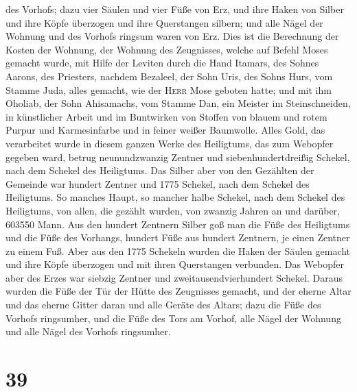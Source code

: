 des Vorhofs;  dazu vier Säulen und vier Füße von Erz, und
ihre Haken von Silber und ihre Köpfe überzogen und ihre Querstangen
silbern;  und alle Nägel der Wohnung und des Vorhofs
ringsum waren von Erz.  Dies ist die Berechnung der
Kosten der Wohnung, der Wohnung des Zeugnisses, welche auf Befehl Moses
gemacht wurde, mit Hilfe der Leviten durch die Hand Itamars, des Sohnes
Aarons, des Priesters,  nachdem Bezaleel, der Sohn Uris,
des Sohns Hurs, vom Stamme Juda, alles gemacht, wie der \textsc{Herr}
Mose geboten hatte;  und mit ihm Oholiab, der Sohn
Ahisamachs, vom Stamme Dan, ein Meister im Steinschneiden, in
künstlicher Arbeit und im Buntwirken von Stoffen von blauem und rotem
Purpur und Karmesinfarbe und in feiner weißer Baumwolle. 
Alles Gold, das verarbeitet wurde in diesem ganzen Werke des Heiligtums,
das zum Webopfer gegeben ward, betrug neunundzwanzig Zentner und
siebenhundertdreißig Schekel, nach dem Schekel des Heiligtums.
 Das Silber aber von den Gezählten der Gemeinde war
hundert Zentner und 1775 Schekel, nach dem Schekel des Heiligtums.
 So manches Haupt, so mancher halbe Schekel, nach dem
Schekel des Heiligtums, von allen, die gezählt wurden, von zwanzig
Jahren an und darüber, 603550 Mann.  Aus den hundert
Zentnern Silber goß man die Füße des Heiligtums und die Füße des
Vorhangs, hundert Füße aus hundert Zentnern, je einen Zentner zu einem
Fuß.  Aber aus den 1775 Schekeln wurden die Haken der
Säulen gemacht und ihre Köpfe überzogen und mit ihren Querstangen
verbunden.  Das Webopfer aber des Erzes war siebzig
Zentner und zweitausendvierhundert Schekel.  Daraus
wurden die Füße der Tür der Hütte des Zeugnisses gemacht, und der eherne
Altar und das eherne Gitter daran und alle Geräte des Altars;
 dazu die Füße des Vorhofs ringsumher, und die Füße des
Tors am Vorhof, alle Nägel der Wohnung und alle Nägel des Vorhofs
ringsumher.

\hypertarget{section-38}{%
\section{39}\label{section-38}}

